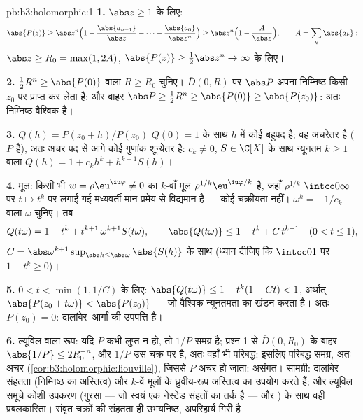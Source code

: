\begin{solution}{pb:b3:holomorphic:1}
\textbf{1.} $\abs z \geq 1$ के लिए:
\[
\abs{P(z)} \geq \abs z^n\Bigl(1 -
\frac{\abs{a_{n-1}}}{\abs z} - \dots -
\frac{\abs{a_0}}{\abs z^n}\Bigr)
\geq \abs z^n\Bigl(1 - \frac{A}{\abs z}\Bigr),
\qquad A = \sum_k\abs{a_k} :
\]
$\abs z \geq R_0 = \max(1, 2A)$, $\abs{P(z)} \geq
\frac12\abs z^n \to \infty$ के लिए।

\textbf{2.} $\frac12R^n \geq
\abs{P(0)}$ वाला $R \geq R_0$ चुनिए।  $\bar D(0, R)$ पर  $\abs P$ अपना
निम्निष्ठ किसी $z_0$ पर प्राप्त कर लेता है; और बाहर $\abs P
\geq \frac12R^n \geq \abs{P(0)} \geq \abs{P(z_0)}$: अतः
निम्निष्ठ वैश्विक है।

\textbf{3.} $Q(h) = P(z_0 + h)/P(z_0)$ $Q(0) = 1$ के साथ $h$ में कोई बहुपद है; वह अचरेतर है
($P$ है), अतः अचर पद से आगे कोई गुणांक शून्येतर है: $c_k \neq 0$, $S \in \C[X]$
के साथ न्यूनतम $k \geq 1$ वाला $Q(h) = 1 +
c_kh^k + h^{k+1}S(h)$।

\textbf{4.} मूल: किसी भी $w = \rho\eu^{\iu\varphi} \neq 0$ का $k$-वाँ मूल $\rho^{1/k}\eu^{\iu\varphi/k}$ है, जहाँ $\rho^{1/k}$
$\intco0\infty$ पर $t \mapsto t^k$ पर लगाई गई मध्यवर्ती मान प्रमेय से विद्यमान है ---
कोई चक्रीयता नहीं। $\omega^k = -1/c_k$ वाला $\omega$ चुनिए। तब
\[
Q(t\omega) = 1 - t^k + t^{k+1}\,\omega^{k+1}S(t\omega),
\qquad
\abs{Q(t\omega)} \leq 1 - t^k + C\,t^{k+1}
\quad (0 < t \leq 1),
\]
$C = \abs\omega^{k+1}\sup_{\abs h \leq
\abs\omega}\abs{S(h)}$ के साथ (ध्यान दीजिए कि $\intcc01$ पर $1 - t^k \geq 0$)।

\textbf{5.} $0 < t < \min(1, 1/C)$ के लिए: $\abs{Q(t\omega)}
\leq 1 - t^k(1 - Ct) < 1$, अर्थात् $\abs{P(z_0 + t\omega)} <
\abs{P(z_0)}$ --- जो वैश्विक
न्यूनतमता का खंडन करता है। अतः $P(z_0) = 0$: दालांबेर--आर्गां की उपपत्ति
 है।

\textbf{6.} ल्यूविल वाला रूप: यदि $P$ कभी लुप्त न हो, तो $1/P$
समग्र है; प्रश्न 1 से $\bar D(0, R_0)$ के बाहर $\abs{1/P} \leq 2R_0^{-n}$, और $1/P$ उस  चक्र पर
 है, अतः वहाँ भी परिबद्ध: इसलिए परिबद्ध समग्र, अतः अचर (\cref{cor:b3:holomorphic:liouville}),
जिससे $P$ अचर हो जाता: असंगत। सामग्री: दालांबेर संहतता (निम्निष्ठ
का अस्तित्व) और $k$-वें मूलों के ध्रुवीय-रूप अस्तित्व का उपयोग
करते हैं; और ल्यूविल समूचे कोशी उपकरण (गुरसा --- जो स्वयं एक नेस्टेड
संहतों का तर्क है --- और ) के साथ वही प्रबलकारिता। संवृत
चक्रों की संहतता ही उभयनिष्ठ, अपरिहार्य गिरी है।


\end{solution}
